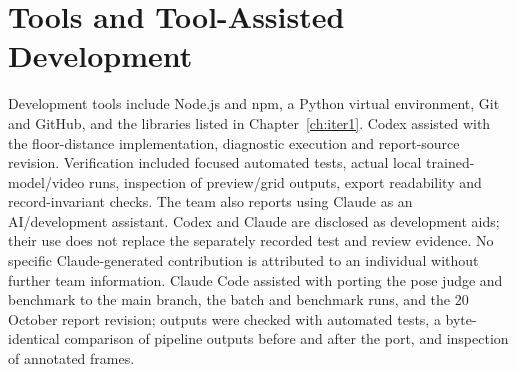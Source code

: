 \section{Tools and Tool-Assisted Development}
Development tools include Node.js and npm, a Python virtual environment, Git and GitHub, and the libraries listed in Chapter~\ref{ch:iter1}. Codex assisted with the floor-distance implementation, diagnostic execution and report-source revision. Verification included focused automated tests, actual local trained-model/video runs, inspection of preview/grid outputs, export readability and record-invariant checks. The team also reports using Claude as an AI/development assistant. Codex and Claude are disclosed as development aids; their use does not replace the separately recorded test and review evidence. No specific Claude-generated contribution is attributed to an individual without further team information. Claude Code assisted with porting the pose judge and benchmark to the main branch, the batch and benchmark runs, and the 20 October report revision; outputs were checked with automated tests, a byte-identical comparison of pipeline outputs before and after the port, and inspection of annotated frames.

